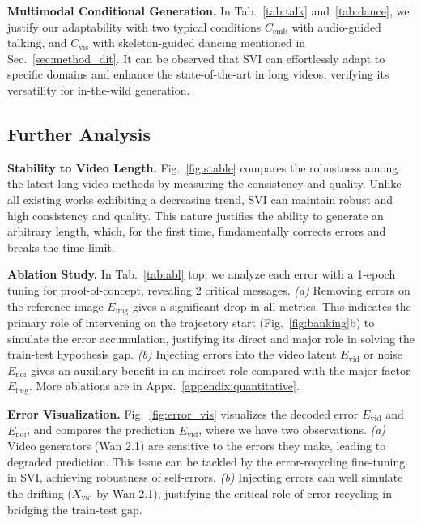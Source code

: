 \documentclass{article} %
\newcommand\vid{\mathrm{vid}}
\newcommand\noi{\mathrm{noi}}
\newcommand\img{\mathrm{img}}
\newcommand{\err}{E}
\newcommand{\cond}{C}
\begin{document}
\vspace{-2pt}\textbf{Multimodal Conditional Generation.} In Tab.~\ref{tab:talk} and~\ref{tab:dance}, we justify our adaptability with two typical conditions $\cond_{\mathrm{emb}}$ with audio-guided talking, and $\cond_{\mathrm{vis}}$ with skeleton-guided dancing mentioned in Sec.~\ref{sec:method_dit}. It can be observed that SVI can effortlessly adapt to specific domains and enhance the state-of-the-art in long videos, verifying its versatility for in-the-wild generation. 


\subsection{Further Analysis}

\vspace{-4pt}
\textbf{Stability to Video Length.} Fig.~\ref{fig:stable} compares the robustness among the latest long video methods by measuring the consistency and quality. Unlike all existing works exhibiting a decreasing trend, SVI can maintain robust and high consistency and quality. This nature justifies the ability to generate an arbitrary length, which, for the first time, fundamentally corrects errors and breaks the time limit.

\vspace{-4pt}
\textbf{Ablation Study.} In Tab.~\ref{tab:abl} top, we analyze each error with a 1-epoch tuning for proof-of-concept, revealing 2 critical messages. \emph{(a)} Removing errors on the reference image $\err_\img$ gives a significant drop in all metrics. This indicates the primary role of intervening on the trajectory start (Fig.~\ref{fig:banking}b) to simulate the error accumulation, justifying its direct and major role in solving the train-test hypothesis gap. \emph{(b)} Injecting errors into the video latent $\err_\vid$ or noise $\err_\noi$ gives an auxiliary benefit in an indirect role compared with the major factor $\err_\img$. More ablations are in Appx.~\ref{appendix:quantitative}.


\vspace{-4pt}
\textbf{Error Visualization.} Fig.~\ref{fig:error_vis} visualizes the decoded error $E_\vid$ and $E_\noi$, and compares the prediction $\hat{E}_\vid$, where we have two observations. \emph{(a)} Video generators (Wan 2.1) are sensitive to the errors they make, leading to degraded prediction. This issue can be tackled by the error-recycling fine-tuning in SVI, achieving robustness of self-errors. \emph{(b)} Injecting errors can well simulate the drifting ($X_\vid$ by Wan 2.1), justifying the critical role of error recycling in bridging the train-test gap.
\end{document}
